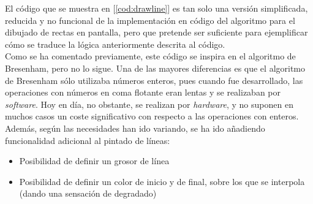 El código que se muestra en [\ref{cod:drawline}] es tan solo una versión simplificada, reducida y no funcional de la implementación en código del algoritmo para el dibujado de rectas en pantalla, pero que pretende ser suficiente para ejemplificar cómo se traduce la lógica anteriormente descrita al código.\\

Como se ha comentado previamente, este código se inspira en el algoritmo de Bresenham, pero no lo sigue. Una de las mayores diferencias es que el algoritmo de Bresenham sólo utilizaba números enteros, pues cuando fue desarrollado, las operaciones con números en coma flotante eran lentas y se realizaban por \emph{software}. Hoy en día, no obstante, se realizan por \emph{hardware}, y no suponen en muchos casos un coste significativo con respecto a las operaciones con enteros.\\

Además, según las necesidades han ido variando, se ha ido añadiendo funcionalidad adicional al pintado de líneas:

\begin{itemize}
	\item Posibilidad de definir un grosor de línea
	\item Posibilidad de definir un color de inicio y de final, sobre los que se interpola (dando una sensación de degradado)
\end{itemize}